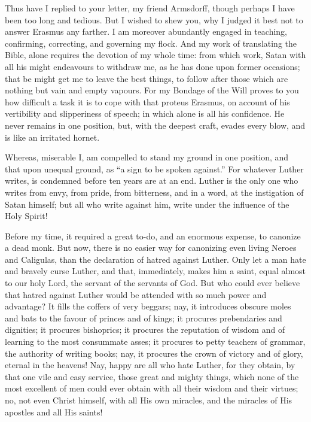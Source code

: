 Thus have I replied to your letter, my friend Armsdorff, though perhaps I have been too long and tedious. But I wished to shew you, why I judged it best not to answer Erasmus any farther. I am moreover abundantly engaged in teaching, confirming, correcting, and governing my flock. And my work of translating the Bible, alone requires the devotion of my whole time: from which work, Satan with all his might endeavours to withdraw me, as he has done upon former occasions; that be might get me to leave the best things, to follow after those which are nothing but vain and empty vapours. For my Bondage of the Will proves to you how difficult a task it is to cope with that proteus Erasmus, on account of his vertibility and slipperiness of speech; in which alone is all his confidence. He never remains in one position, but, with the deepest craft, evades every blow, and is like an irritated hornet.

Whereas, miserable I, am compelled to stand my ground in one position, and that upon unequal ground, as “a sign to be spoken against.” For whatever Luther writes, is condemned before ten years are at an end. Luther is the only one who writes from envy, from pride, from bitterness, and in a word, at the instigation of Satan himself; but all who write against him, write under the influence of the Holy Spirit!

Before my time, it required a great to-do, and an enormous expense, to canonize a dead monk. But now, there is no easier way for canonizing even living Neroes and Caligulas, than the declaration of hatred against Luther. Only let a man hate and bravely curse Luther, and that, immediately, makes him a saint, equal almost to our holy Lord, the servant of the servants of God. But who could ever believe that hatred against Luther would be attended with so much power and advantage? It fills the coffers of very beggars; nay, it introduces obscure moles and bats to the favour of princes and of kings; it procures prebendaries and dignities; it procures bishoprics; it procures the reputation of wisdom and of learning to the most consummate asses; it procures to petty teachers of grammar, the authority of writing books; nay, it procures the crown of victory and of glory, eternal in the heavens! Nay, happy are all who hate Luther, for they obtain, by that one vile and easy service, those great and mighty things, which none of the most excellent of men could ever obtain with all their wisdom and their virtues; no, not even Christ himself, with all His own miracles, and the miracles of His apostles and all His saints!

